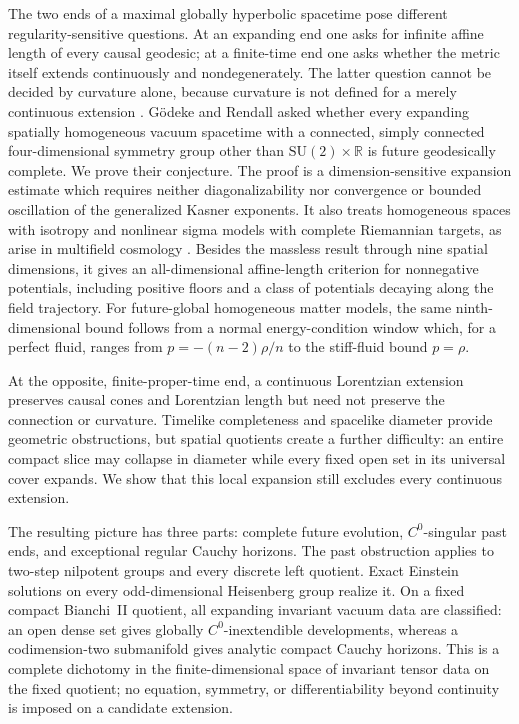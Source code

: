 \documentclass[10pt,a4paper]{article}
\numberwithin{equation}{section}
\theoremstyle{definition}
\theoremstyle{remark}
\begin{document}
The two ends of a maximal globally hyperbolic spacetime pose different
regularity-sensitive questions.  At an expanding end one asks for
infinite affine length of every causal geodesic; at a finite-time end one
asks whether the metric itself extends continuously and nondegenerately.
The latter question cannot be decided by curvature alone, because
curvature is not defined for a merely continuous extension
\cite{GLS2018,Sbierski2018,SbierskiProof2018}.
G\"odeke and Rendall asked whether every expanding spatially homogeneous
vacuum spacetime with a connected, simply connected four-dimensional
symmetry group other than $\mathrm{SU}(2)\times\mathbb R$ is future
geodesically complete.  We prove their conjecture.  The proof is a
dimension-sensitive expansion estimate which requires neither
diagonalizability nor convergence or bounded oscillation of the
generalized Kasner exponents.  It also treats homogeneous spaces with
isotropy and nonlinear sigma models with complete Riemannian targets, as
arise in multifield cosmology \cite{Lazaroiu2022}.  Besides the massless
result through nine spatial dimensions, it gives an all-dimensional
affine-length criterion for nonnegative potentials, including positive
floors and a class of potentials decaying along the field trajectory.
For future-global homogeneous matter models, the same ninth-dimensional
bound follows from a normal energy-condition window which, for a perfect
fluid, ranges from $p=-(n-2)\rho/n$ to the stiff-fluid bound $p=\rho$.

At the opposite, finite-proper-time end, a continuous Lorentzian
extension preserves causal cones and Lorentzian length but need not
preserve the connection or curvature.  Timelike completeness and
spacelike diameter provide geometric obstructions, but spatial quotients
create a further difficulty: an entire compact slice may collapse in
diameter while every fixed open set in its universal cover expands.  We
show that this local expansion still excludes every continuous extension.

The resulting picture has three parts: complete future evolution,
$C^0$-singular past ends, and exceptional regular Cauchy horizons.  The
past obstruction applies to two-step nilpotent groups and every discrete
left quotient.  Exact Einstein solutions on every odd-dimensional
Heisenberg group realize it.  On a fixed compact Bianchi~II quotient, all
expanding invariant vacuum data are classified: an open dense set gives
globally $C^0$-inextendible developments, whereas a codimension-two
submanifold gives analytic compact Cauchy horizons.  This is a complete
dichotomy in the finite-dimensional space of invariant tensor data on the
fixed quotient; no equation, symmetry, or differentiability beyond
continuity is imposed on a candidate extension.
\end{document}
